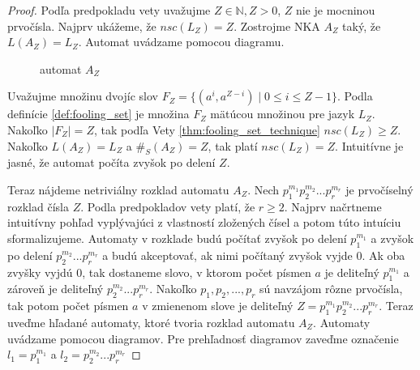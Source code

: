 \begin{proof}
Podľa predpokladu vety uvažujme $ Z \in \mathbb{N}, Z > 0 $, $ Z $ nie je mocninou prvočísla. Najprv ukážeme, že $ nsc(L_Z) = Z $. Zostrojme NKA $ A_Z $ taký, že $ L(A_Z)=L_Z $. Automat uvádzame pomocou diagramu.

\begin{figure}[H]
\centering
{}
\caption{automat $ A_Z $} \label{fig:Az}
\end{figure}

Uvažujme množinu dvojíc slov $ F_Z = \lbrace (a^{i},a^{Z-i}) \; | \; 0 \leq i \leq Z-1 \rbrace $. Podla definície \ref{def:fooling_set} je množina $ F_Z $ mätúcou množinou pre jazyk $ L_Z $. Nakoľko $ |F_Z|=Z $, tak podľa Vety \ref{thm:fooling_set_technique} $ nsc(L_Z) \geq Z $. Nakoľko $ L(A_Z) = L_Z $ a $ \#_S(A_Z) = Z $, tak platí $ nsc(L_Z) = Z$. Intuitívne je jasné, že automat \glqq{}počíta zvyšok po delení $ Z $\grqq{}.
\par
Teraz nájdeme netriviálny rozklad automatu $ A_Z $. Nech $ p_{1}^{m_1}p_{2}^{m_2}...p_{r}^{m_r} $ je prvočíselný rozklad čísla $ Z $. Podla predpokladov vety platí, že $ r \geq 2 $. Najprv načrtneme intuitívny pohľad vyplývajúci z vlastností zložených čísel a potom túto intuíciu sformalizujeme. Automaty v rozklade budú počítať zvyšok po delení $ p_{1}^{m_1} $ a zvyšok po delení $p_{2}^{m_2}...p_{r}^{m_r} $ a budú akceptovať, ak nimi počítaný zvyšok vyjde 0. Ak oba zvyšky vyjdú 0, tak dostaneme slovo, v ktorom počet písmen $ a $ je deliteľný $ p_{1}^{m_1} $ a zároveň je deliteľný $p_{2}^{m_2}...p_{r}^{m_r} $. Nakoľko $ p_1, p_2,...,p_r $ sú navzájom rôzne prvočísla, tak potom počet písmen $ a $ v zmienenom slove je deliteľný $ Z=p_{1}^{m_1}p_{2}^{m_2}...p_{r}^{m_r} $. Teraz uveďme hľadané automaty, ktoré tvoria rozklad automatu $ A_Z $. Automaty uvádzame pomocou diagramov. Pre prehľadnosť diagramov zaveďme označenie $ l_1 = p_{1}^{m_1} $ a $ l_2 = p_{2}^{m_2}...p_{r}^{m_r} $


\end{proof}
